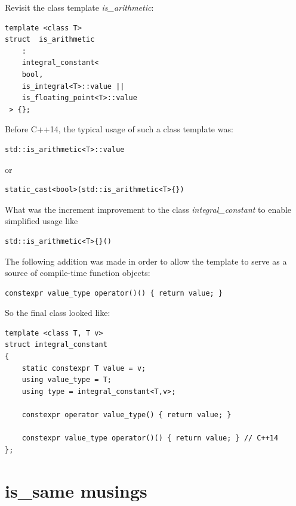 \begin{Exercise}[title={\small Incremental improvement to integral\_constant}, difficulty=3, label=ex013]
Revisit the class template \emph{is\_arithmetic}:
\begin{lstlisting}
template <class T> 
struct  is_arithmetic
    :  
    integral_constant<
    bool, 
    is_integral<T>::value ||
    is_floating_point<T>::value
 > {};
\end{lstlisting}

Before C++14, the typical usage of such a class template was:
\begin{lstlisting}
std::is_arithmetic<T>::value
\end{lstlisting}
or
\begin{lstlisting}
static_cast<bool>(std::is_arithmetic<T>{})
\end{lstlisting}

What was the increment improvement to the class \emph{integral\_constant} to enable simplified usage like
\begin{lstlisting}
std::is_arithmetic<T>{}()
\end{lstlisting}
\end{Exercise}


\begin{Answer}[ref=ex013]

The following addition was made in order to allow the template to serve as a source of compile-time function objects:
\begin{lstlisting}
constexpr value_type operator()() { return value; }
\end{lstlisting}
So the final class looked like:
\begin{lstlisting}
template <class T, T v>
struct integral_constant 
{
    static constexpr T value = v;
    using value_type = T;
    using type = integral_constant<T,v>;

    constexpr operator value_type() { return value; } 
    
    constexpr value_type operator()() { return value; } // C++14
};
\end{lstlisting}
\end{Answer}



\section{is\_same musings}

